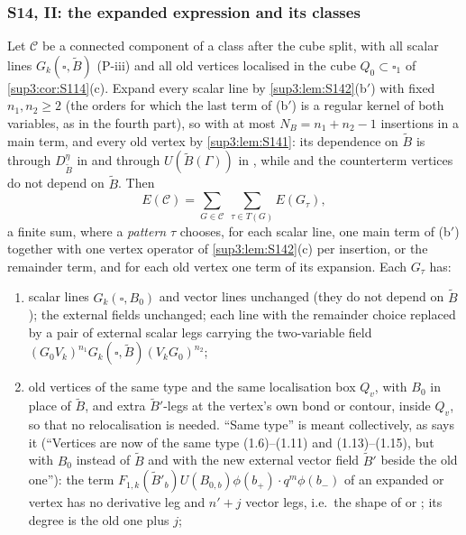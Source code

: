 
\subsubsection{S14, II: the expanded expression and its classes}\label{sup3:ssec:S14b}

\begin{lemma}\label{sup3:lem:S143}
Let $\mathcal C$ be a connected component of a class after the cube split, with all scalar lines $G_k(\square,\tilde B)$ (P-iii) and all old vertices localised in the cube $Q_0\subset\square_1$ of \cref{sup3:cor:S114}(c). Expand every scalar line by \cref{sup3:lem:S142}(b$'$) with fixed $n_1,n_2\ge2$ (the orders for which the last term of (b$'$) is a regular kernel of both variables, as in the fourth part), so with at most $N_B=n_1+n_2-1$ insertions in a main term, and every old vertex by \cref{sup3:lem:S141}: its dependence on $\tilde B$ is through $D^\eta_{\tilde B}$ in \cite[(1.8)--(1.9)]{Ba3} and through $U(\tilde B(\Gamma))$ in \cite[(1.13)--(1.15)]{Ba3}, while \cite[(1.6), (1.7), (1.10), (1.11)]{Ba3} and the counterterm vertices do not depend on $\tilde B$. Then
\[
E(\mathcal C)=\sum_{G\in\mathcal C}\ \sum_{\tau\in T(G)}E(G_\tau),
\]
a finite sum, where a \emph{pattern} $\tau$ chooses, for each scalar line, one main term of (b$'$) together with one vertex operator of \cref{sup3:lem:S142}(c) per insertion, or the remainder term, and for each old vertex one term of its expansion. Each $G_\tau$ has:
\begin{enumerate}[label=\textup{(\roman*)},nosep,leftmargin=*]
\item scalar lines $G_k(\square,B_0)$ and vector lines unchanged (they do not depend on $\tilde B$); the external fields unchanged; each line with the remainder choice replaced by a pair of external scalar legs carrying the two-variable field $(G_0V_k)^{n_1}G_k(\square,\tilde B)(V_kG_0)^{n_2}$;
\item old vertices of the same type and the same localisation box $Q_v$, with $B_0$ in place of $\tilde B$, and extra $\tilde B'$-legs at the vertex's own bond or contour, inside $Q_v$, so that no relocalisation is needed. ``Same type'' is meant collectively, as \cite[p.~433]{Ba3} says it (``Vertices are now of the same type (1.6)--(1.11) and (1.13)--(1.15), but with $B_0$ instead of $\tilde B$ and with the new external vector field $\tilde B'$ beside the old one''): the term $F_{1,k}(\tilde B'_b)U(B_{0,b})\phi(b_+)\cdot q^m\phi(b_-)$ of an expanded \cite[(1.8)]{Ba3} or \cite[(1.9)]{Ba3} vertex has no derivative leg and $n'+j$ vector legs, i.e.\ the shape of \cite[(1.10)]{Ba3} or \cite[(1.11)]{Ba3}; its degree is the old one plus $j$;

\end{enumerate}
\end{lemma}
